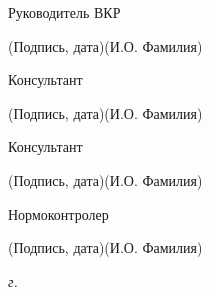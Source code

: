 \documentclass[14pt, russian]{scrartcl}
\begin{document}
\begin{titlepage}
\bigskip

\noindent Руководитель ВКР \hfill \underline{\hspace{4cm}}\quad
\underline{\hspace{4cm}}

\vspace{-2ex}
\noindent\hspace{13.5ex}\normalsize\hspace{170pt}\hspace{2ex}\scriptsize{(Подпись, дата)}\normalsize\hspace{30pt}\hspace{6ex}\scriptsize{(И.О. Фамилия)}\normalsize
\bigskip

\noindent Консультант \hfill \underline{\hspace{4cm}}\quad
\underline{\hspace{4cm}}

\vspace{-2ex}
\noindent\hspace{13.5ex}\normalsize\hspace{170pt}\hspace{2ex}\scriptsize{(Подпись, дата)}\normalsize\hspace{30pt}\hspace{6ex}\scriptsize{(И.О. Фамилия)}\normalsize
\bigskip

\noindent Консультант \hfill \underline{\hspace{4cm}}\quad
\underline{\hspace{4cm}}

\vspace{-2ex}
\noindent\hspace{13.5ex}\normalsize\hspace{170pt}\hspace{2ex}\scriptsize{(Подпись, дата)}\normalsize\hspace{30pt}\hspace{6ex}\scriptsize{(И.О. Фамилия)}\normalsize

\bigskip

\noindent Нормоконтролер \hfill \underline{\hspace{4cm}}\quad
\underline{\hspace{4cm}}

\vspace{-2ex}
\noindent\hspace{13.5ex}\normalsize\hspace{170pt}\hspace{2ex}\scriptsize{(Подпись, дата)}\normalsize\hspace{30pt}\hspace{6ex}\scriptsize{(И.О. Фамилия)}\normalsize
\vfill

 


\begin{center}
\textsl{\the\year{} г.}
\end{center}
\end{titlepage}
\end{document}
